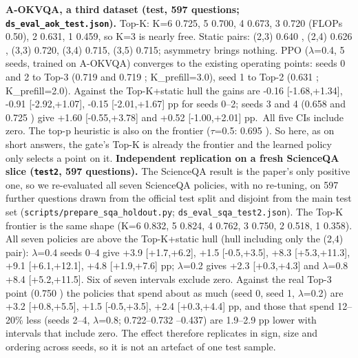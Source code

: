 \textbf{A-OKVQA, a third dataset (test, 597 questions; \texttt{ds\_eval\_aok\_test.json}).} Top-K: K=6 0.725, 5 0.700, 4 0.673, 3 0.720 (FLOPs 0.50), 2 0.631, 1 0.459, so K=3 is nearly free. Static pairs: (2,3) 0.640 \citet{0.337}, (2,4) 0.626 \citet{0.340}, (3,3) 0.720, (3,4) 0.715, (3,5) 0.715; asymmetry brings nothing. PPO ($\lambda$=0.4, 5 seeds, trained on A-OKVQA) converges to the existing operating points: seeds 0 and 2 to Top-3 (0.719 \citet{0.502} and 0.719 \citet{0.501}; K\_prefill=3.0), seed 1 to Top-2 (0.631 \citet{0.338}; K\_prefill=2.0). Against the Top-K+static hull the gains are -0.16 {[}-1.68,+1.34{]}, -0.91 {[}-2.92,+1.07{]}, -0.15 {[}-2.01,+1.67{]} pp for seeds 0--2; seeds 3 and 4 (0.658 \citet{0.342} and 0.725 \citet{0.501}) give +1.60 {[}-0.55,+3.78{]} and +0.52 {[}-1.00,+2.01{]} pp.~All five CIs include zero. The top-p heuristic is also on the frontier ($\tau$=0.5: 0.695 \citet{0.450}). So here, as on short answers, the gate's Top-K is already the frontier and the learned policy only selects a point on it.
\textbf{Independent replication on a fresh ScienceQA slice (\texttt{test2}, 597 questions).} The ScienceQA result is the paper's only positive one, so we re-evaluated all seven ScienceQA policies, with no re-tuning, on 597 further questions drawn from the official test split and disjoint from the main test set (\texttt{scripts/prepare\_sqa\_holdout.py}; \texttt{ds\_eval\_sqa\_test2.json}). The Top-K frontier is the same shape (K=6 0.832, 5 0.824, 4 0.762, 3 0.750, 2 0.518, 1 0.358). All seven policies are above the Top-K+static hull (hull including only the (2,4) pair): $\lambda$=0.4 seeds 0--4 give +3.9 {[}+1.7,+6.2{]}, +1.5 {[}-0.5,+3.5{]}, +8.3 {[}+5.3,+11.3{]}, +9.1 {[}+6.1,+12.1{]}, +4.8 {[}+1.9,+7.6{]} pp; $\lambda$=0.2 gives +2.3 {[}+0.3,+4.3{]} and $\lambda$=0.8 +8.4 {[}+5.2,+11.5{]}. Six of seven intervals exclude zero. Against the real Top-3 point (0.750 \citet{0.500}) the policies that spend about as much (seed 0, seed 1, $\lambda$=0.2) are +3.2 {[}+0.8,+5.5{]}, +1.5 {[}-0.5,+3.5{]}, +2.4 {[}+0.3,+4.4{]} pp, and those that spend 12--20\% less (seeds 2--4, $\lambda$=0.8; 0.722--0.732 \citet{0.398}--0.437) are 1.9--2.9 pp lower with intervals that include zero. The effect therefore replicates in sign, size and ordering across seeds, so it is not an artefact of one test sample.

